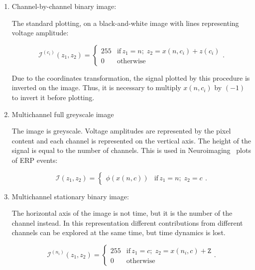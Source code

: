 \begin{enumerate}
\item Channel-by-channel binary image:

The standard plotting, on a black-and-white image with lines representing voltage amplitude:

\begin{equation}
\mathcal{I}^{(c_i)}(z_1,z_2)= \left\{ \begin{array}{rl}
255 & \text{if} \,  z_1 =  n; \; z_2 = x(n,c_i) + z(c_i) \\
0   & \mbox{otherwise}
\end{array}\right    ..
\label{eq:image1}
\end{equation}

Due to the coordinates transformation, the signal plotted by this procedure is inverted on the image.  Thus, it is necessary to multiply $x(n,c_i)$ by $(-1)$ to invert it before plotting.

\item Multichannel full greyscale image

The image is greyscale. Voltage amplitudes are represented by the pixel content and each channel is represented on the vertical axis.  The height of the signal is equal to the number of channels.   This is used in Neuroimaging~\cite{Freeman2013} plots of ERP events:

\begin{equation}
\mathcal{I}(z_1,z_2) = \left\{ \begin{array}{rl} \phi(x(n,c))  & \text{if} \,  z_1 = n; \; z_2 = c \end{array}\right. .
\label{eq:image3}
\end{equation}


\item Multichannel stationary binary image:

The horizontal axis of the image is not time, but it is the number of the channel instead.   In this representation different contributions from different channels can be explored at the same time, but time dynamics is lost.  

\begin{equation}
\mathcal{I}^{(n_i)}(z_1,z_2) = \left\{ \begin{array}{rl}
255 & \text{if} \,  z_1 = c; \; z_2 =  x(n_i,c) + \mathtt{Z} \\
0   & \mbox{otherwise}
\end{array}\right ..
\label{eq:image4}
\end{equation}


\end{enumerate}
